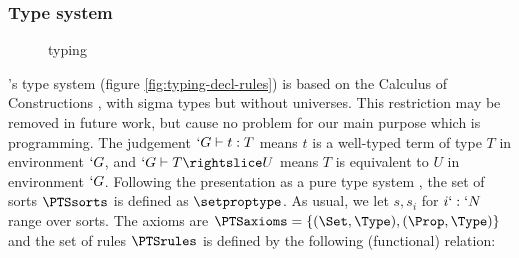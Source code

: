 \documentclass{llncs}
\begin{document}
\subsubsection{Type system}
\begin{figure}[t]
  \begin{center}
    \def\infvspace{0.1in}
    \def\seq{\typed}
    \def\fCenter{\wf}
    
    \WfEmpty\DP\WfVar\DP

    \def\fCenter{\typed}
    \vspace{\infvspace}

    \Var\DP\PropSet\DP
    
    \vspace{\infvspace}
    \Subsum\DP
       
    \vspace{\infvspace}
    \Prod\DP
    
    \vspace{\infvspace}
    \Abs\DP

    \vspace{\infvspace}
    \App\DP

    \vspace{\infvspace}
    \SigmaR\DP
    
    \vspace{\infvspace}
    \SumDep\DP

    \vspace{\infvspace}
    \PiLeft\DP
    \quad
    \PiRight\DP

    \vspace{\infvspace}
    \SubsetR\DP
  \end{center}
  \vspace{-2em}
  \caption{\Russell{} typing}
  \label{fig:typing-decl-rules}
  \vspace{-1em}
\end{figure}
%
\Russell{}'s type system (figure \vref{fig:typing-decl-rules}) is based
on the Calculus of Constructions \cite{coquandhuet88,Barras99}, with sigma types but without universes.
This restriction may be removed in future work, but cause no problem for
our main purpose which is programming. The judgement $`G \vdash t : T$
means $t$ is a well-typed term of type $T$ in environment $`G$, and $`G
\typed T \subd U$ means $T$ is equivalent to $U$ in environment $`G$. 
Following the presentation as a pure type system \cite{barendregt91}, 
the set of sorts $\PTSsorts$ is defined as $\setproptype$. As usual, we
let $s, s_i$ for $i `: `N$ range over sorts. The
axioms are $\PTSaxioms = \{ (\Set, \Type), (\Prop, \Type) \}$ and the
set of rules $\PTSrules$ is defined by the following (functional) relation:
  \axiomsd
\end{document}
